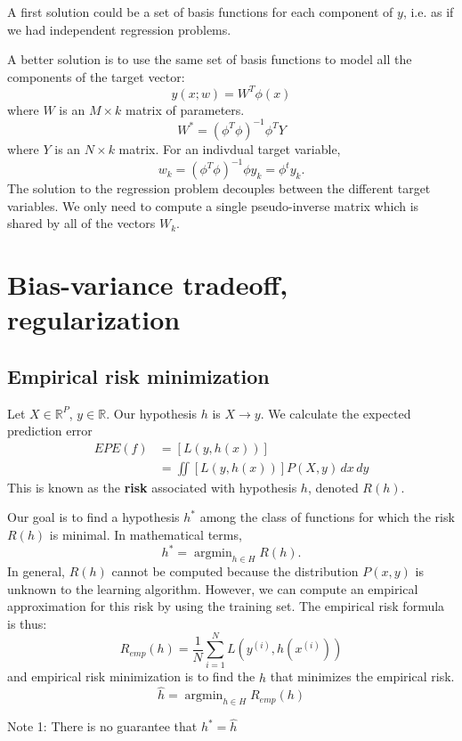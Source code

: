 \documentclass[a4paper,12pt]{article}
\DeclareMathOperator*{\argmin}{argmin}
\begin{document}
A first solution could be a set of basis functions for each component of $y$, i.e. as if we had independent regression problems. 

A better solution is to use the same set of basis functions to model all the components of the target vector: 
$$\hat y (x; w) = W^T \phi(x)$$
where $W$ is an $M\times k$ matrix of parameters. 
$$W^* = (\phi^T\phi)^{-1}\phi^TY$$
where $Y$ is an $N\times k$ matrix. For an indivdual target variable, 
$$w_k = (\phi^T\phi)^{-1}\phi y_k = \phi^t y_k.$$
The solution to the regression problem decouples between the different target variables. We only need to compute a single pseudo-inverse matrix which is shared by all of the vectors $W_k$. 


\clearpage

\section{Bias-variance tradeoff, regularization}

\subsection{Empirical risk minimization}

Let $X \in \mathbb{R}^P$, $y \in \mathbb{R}$. Our hypothesis $h$ is $X \rightarrow y$. We calculate the expected prediction error
\begin{align*}
EPE(f) &= \left[L(y, h(x))\right] \\
		&= \iint \left[L(y, h(x))\right] P(X, y) \,dx \,dy
\end{align*}
This is known as the \textbf{risk} associated with hypothesis $h$, denoted $R(h)$. 

Our goal is to find a hypothesis $h^*$ among the class of functions for which the risk $R(h)$ is minimal. In mathematical terms, 
$$h^* = \argmin_{h\in H} R(h).$$
In general, $R(h)$ cannot be computed because the distribution $P(x, y)$ is unknown to the learning algorithm. However, we can compute an empirical approximation for this risk by using the training set. The empirical risk formula is thus: 
$$R_{emp}(h) = \frac{1}{N} \sum_{i=1}^N L\left(y^{(i)}, h(x^{(i)})\right)$$
and empirical risk minimization is to find the $\hat h$ that minimizes the empirical risk. 
$$\hat h = \argmin_{h\in H} R_{emp}(h)$$

Note 1: There is no guarantee that $h^* = \hat h$
\end{document}
